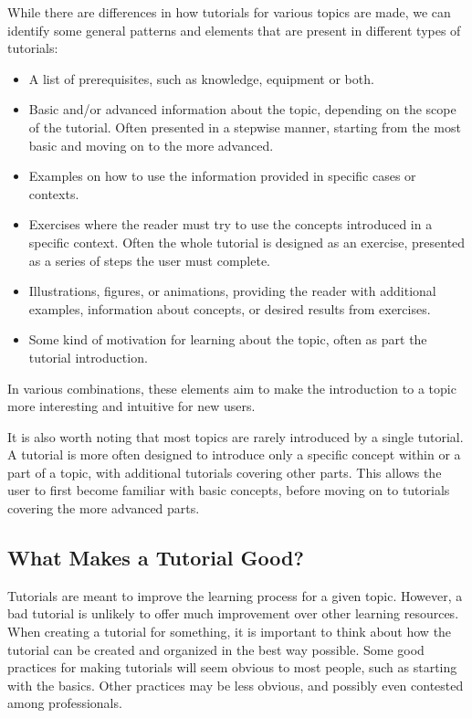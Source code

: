 \noindent
While there are differences in how tutorials for various topics are made, we can identify some general patterns and elements that are present in different types of tutorials:
\begin{itemize}
	\item A list of prerequisites, such as knowledge, equipment or both.
	\item Basic and/or advanced information about the topic, depending on the scope of the tutorial. Often presented in a stepwise manner, starting from the most basic and moving on to the more advanced.
	\item Examples on how to use the information provided in specific cases or contexts.
	\item Exercises where the reader must try to use the concepts introduced in a specific context. Often the whole tutorial is designed as an exercise, presented as a series of steps the user must complete.
	\item Illustrations, figures, or animations, providing the reader with additional examples, information about concepts, or desired results from exercises.
	\item Some kind of motivation for learning about the topic, often as part the tutorial introduction.
\end{itemize}

\noindent
In various combinations, these elements aim to make the introduction to a topic more interesting and intuitive for new users.

\noindent
It is also worth noting that most topics are rarely introduced by a single tutorial. A tutorial is more often designed to introduce only a specific concept within or a part of a topic, with additional tutorials covering other parts. This allows the user to first become familiar with basic concepts, before moving on to tutorials covering the more advanced parts.

\subsection{What Makes a Tutorial Good?}
\label{sec:good_tutorials}
Tutorials are meant to improve the learning process for a given topic. However, a bad tutorial is unlikely to offer much improvement over other learning resources. When creating a tutorial for something, it is important to think about how the tutorial can be created and organized in the best way possible. Some good practices for making tutorials will seem obvious to most people, such as starting with the basics. Other practices may be less obvious, and possibly even contested among professionals.

